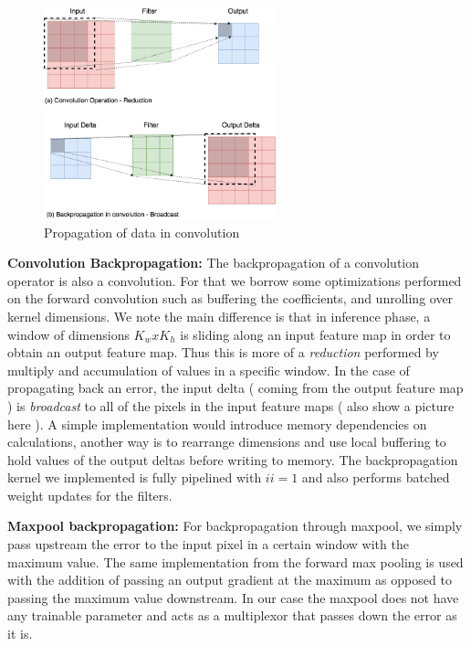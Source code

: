 \begin{figure}[h]
\centering
\includegraphics[width=0.6\textwidth]{Figures/convprop}
\caption[Propagation of data in convolution]{ Propagation of data in convolution }
\decoRule
\label{fig:conv}
\end{figure}

\textbf{Convolution Backpropagation:} The backpropagation of a convolution operator is also a convolution. For that we borrow some optimizations performed on the forward convolution such as buffering the coefficients, and unrolling over kernel dimensions. We note the main difference is that in inference phase, a window of dimensions $ K_wxK_h $ is sliding along an input feature map in order to obtain an output feature map. Thus this is more of a \emph{reduction} performed by multiply and accumulation of values in a specific window. In the case of propagating back an error, the input delta ( coming from the output feature map ) is \emph{broadcast} to all of the pixels in the input feature maps ( also show a picture here ). A simple implementation would introduce memory dependencies on calculations, another way is to rearrange dimensions and use local buffering to hold values of the output deltas before writing to memory. The backpropagation kernel we implemented is fully pipelined with $ ii=1 $ and also performs batched weight updates for the filters.

\textbf{Maxpool backpropagation:} For backpropagation through maxpool, we simply pass upstream the error to the input pixel in a certain window with the maximum value. The same implementation from the forward max pooling is used with the addition of passing an output gradient at the maximum as opposed to passing the maximum value downstream. In our case the maxpool does not have any trainable parameter and acts as a multiplexor that passes down the error as it is. 

